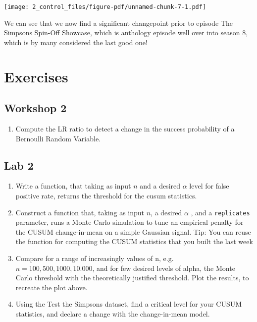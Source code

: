 \documentclass[
  letterpaper,
  DIV=11,
  numbers=noendperiod]{scrreprt}
\providecommand{\tightlist}{%
  \setlength{\itemsep}{0pt}\setlength{\parskip}{0pt}}\usepackage{longtable,booktabs,array}
\begin{document}
\texttt{[image: 2\_control\_files/figure-pdf/unnamed-chunk-7-1.pdf]}

We can see that we now find a significant changepoint prior to episode
The Simpsons Spin-Off Showcase, which is anthology episode well over
into season 8, which is by many considered the last good one!

\section{Exercises}\label{exercises-1}

\subsection{Workshop 2}\label{workshop-2}

\begin{enumerate}
\def\labelenumi{\arabic{enumi}.}
\tightlist
\item
  Compute the LR ratio to detect a change in the success probability of
  a Bernoulli Random Variable.
\end{enumerate}

\subsection{Lab 2}\label{lab-2}

\begin{enumerate}
\def\labelenumi{\arabic{enumi}.}
\item
  Write a function, that taking as input \(n\) and a desired \(\alpha\)
  level for false positive rate, returns the threshold for the cusum
  statistics.
\item
  Construct a function that, taking as input \(n\), a desired \(\alpha\)
  , and a \texttt{replicates} parameter, runs a Monte Carlo simulation
  to tune an empirical penalty for the CUSUM change-in-mean on a simple
  Gaussian signal. Tip: You can reuse the function for computing the
  CUSUM statistics that you built the last week
\item
  Compare for a range of increasingly values of n,
  e.g.~\(n = 100, 500, 1000, 10.000\), and for few desired levels of
  alpha, the Monte Carlo threshold with the theoretically justified
  threshold. Plot the results, to recreate the plot above.
\item
  Using the Test the Simpsons dataset, find a critical level for your
  CUSUM statistics, and declare a change with the change-in-mean model.
\end{enumerate}
\end{document}
